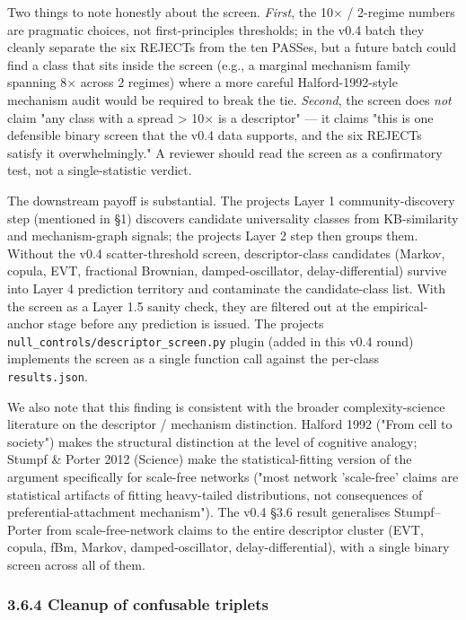 \documentclass[
  11pt]{article}
\begin{document}
Two things to note honestly about the screen. \emph{First}, the
10× / 2-regime numbers are pragmatic choices, not first-principles
thresholds; in the v0.4 batch they cleanly separate the six REJECTs from
the ten PASSes, but a future batch could find a class that sits inside
the screen (e.g., a marginal mechanism family spanning 8× across 2
regimes) where a more careful Halford-1992-style mechanism audit would
be required to break the tie. \emph{Second}, the screen does \emph{not}
claim "any class with a spread > 10× is a descriptor" --- it claims
"this is one defensible binary screen that the v0.4 data supports, and
the six REJECTs satisfy it overwhelmingly." A reviewer should read the
screen as a confirmatory test, not a single-statistic verdict.

The downstream payoff is substantial. The project\textquotesingle s
Layer 1 community-discovery step (mentioned in §1) discovers candidate
universality classes from KB-similarity and mechanism-graph signals;
the project\textquotesingle s Layer 2 step then groups them. Without the
v0.4 scatter-threshold screen, descriptor-class candidates (Markov,
copula, EVT, fractional Brownian, damped-oscillator, delay-differential)
survive into Layer 4 prediction territory and contaminate the
candidate-class list. With the screen as a Layer 1.5 sanity check, they
are filtered out at the empirical-anchor stage before any prediction is
issued. The project\textquotesingle s
\texttt{null\_controls/descriptor\_screen.py} plugin (added in this v0.4
round) implements the screen as a single function call against the
per-class \texttt{results.json}.

We also note that this finding is consistent with the broader
complexity-science literature on the descriptor / mechanism distinction.
Halford 1992 ("From cell to society") makes the structural distinction
at the level of cognitive analogy; Stumpf \& Porter 2012 (Science) make
the statistical-fitting version of the argument specifically for
scale-free networks ("most network 'scale-free' claims are statistical
artifacts of fitting heavy-tailed distributions, not consequences of
preferential-attachment mechanism"). The v0.4 §3.6 result generalises
Stumpf--Porter from scale-free-network claims to the entire descriptor
cluster (EVT, copula, fBm, Markov, damped-oscillator,
delay-differential), with a single binary screen across all of them.

\subsubsection{3.6.4 Cleanup of confusable
triplets}\label{364-cleanup-of-confusable-triplets}
\end{document}

